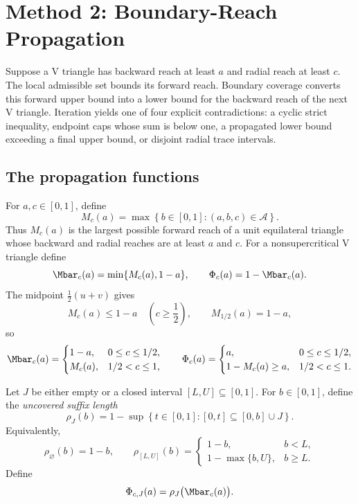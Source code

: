 \section{Method 2: Boundary-Reach Propagation}
\label{sec:strategy2-summary}

Suppose a V triangle has backward reach at least $a$ and radial reach at
least $c$.  The local admissible set bounds its forward reach.  Boundary
coverage converts this forward upper bound into a lower bound for the backward
reach of the next V triangle.  Iteration yields one of four explicit
contradictions: a cyclic strict inequality, endpoint caps whose sum is below
one, a propagated lower bound exceeding a final upper bound, or disjoint radial
trace intervals.

\subsection{The propagation functions}

\begin{definition}
\label{def:body-transfer-alphabet}
For $a,c\in[0,1]$, define
\[
 M_c(a)=\max\left\{b\in[0,1]:(a,b,c)\in\mathcal A\right\}.
\]
Thus $M_c(a)$ is the largest possible forward reach of a unit equilateral
triangle whose backward and radial reaches are at least $a$ and $c$.  For a
nonsupercritical V triangle define
\[
 \Mbar_c(a)=\min\{M_c(a),1-a\},
 \qquad
 \Phi_c(a)=1-\Mbar_c(a).
\]
The midpoint $\frac12(u+v)$ gives
\begin{equation}
 M_c(a)\le1-a\quad\left(c\ge\frac12\right),
 \qquad
 M_{1/2}(a)=1-a,
 \label{eq:body-midpoint-threshold}
\end{equation}
so
\[
 \Mbar_c(a)=
 \begin{cases}
 1-a,&0\le c\le1/2,\\
 M_c(a),&1/2<c\le1,
 \end{cases}
 \qquad
 \Phi_c(a)=
 \begin{cases}
 a,&0\le c\le1/2,\\
 1-M_c(a)\ge a,&1/2<c\le1.
 \end{cases}
\]
\end{definition}

\begin{definition}
\label{def:body-center-assisted-transfer}
Let $J$ be either empty or a closed interval $[L,U]\subseteq[0,1]$.  For
$b\in[0,1]$, define the \emph{uncovered suffix length}
\[
 \rho_J(b)=1-\sup\left\{t\in[0,1]:[0,t]\subseteq[0,b]\cup J\right\}.
\]
Equivalently,
\[
 \rho_\varnothing(b)=1-b,
 \qquad
 \rho_{[L,U]}(b)=
 \begin{cases}
 1-b,&b<L,\\
 1-\max\{b,U\},&b\ge L.
 \end{cases}
\]
Define
\[
 \Phi_{c,J}(a)=\rho_J\bigl(\Mbar_c(a)\bigr).
\]
\end{definition}

